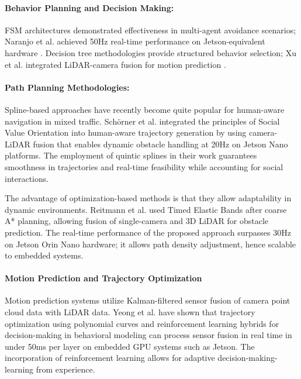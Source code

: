 \documentclass[12pt, a4paper]{report}
\begin{document}
\paragraph{Behavior Planning and Decision Making:}

FSM architectures demonstrated effectiveness in multi-agent avoidance scenarios; Naranjo et al. achieved 50Hz real-time performance on Jetson-equivalent hardware \cite{ref16}. Decision tree methodologies provide structured behavior selection; Xu et al. integrated \ac{LiDAR}-camera fusion for motion prediction \cite{ref17}.

\paragraph{Path Planning Methodologies:}

Spline-based approaches have recently become quite popular for human-aware navigation in mixed traffic. Schörner et al. \cite{ref18} integrated the principles of Social Value Orientation into human-aware trajectory generation by using camera-\ac{LiDAR} fusion that enables dynamic obstacle handling at 20Hz on Jetson Nano platforms. The employment of quintic splines in their work guarantees smoothness in trajectories and real-time feasibility while accounting for social interactions.

The advantage of optimization-based methods is that they allow adaptability in dynamic environments. Reitmann et al. \cite{ref19} used Timed Elastic Bands after coarse A* planning, allowing fusion of single-camera and 3D \ac{LiDAR} for obstacle prediction. The real-time performance of the proposed approach surpasses 30Hz on Jetson Orin Nano hardware; it allows path density adjustment, hence scalable to embedded systems.
\paragraph{Motion Prediction and Trajectory Optimization}

Motion prediction systems utilize Kalman-filtered sensor fusion of camera point cloud data with \ac{LiDAR} data. Yeong et al. \cite{ref20} have shown that trajectory optimization using polynomial curves and reinforcement learning hybrids for decision-making in behavioral modeling can process sensor fusion in real time in under 50ms per layer on embedded GPU systems such as Jetson. The incorporation of reinforcement learning allows for adaptive decision-making-learning from experience.
\end{document}
